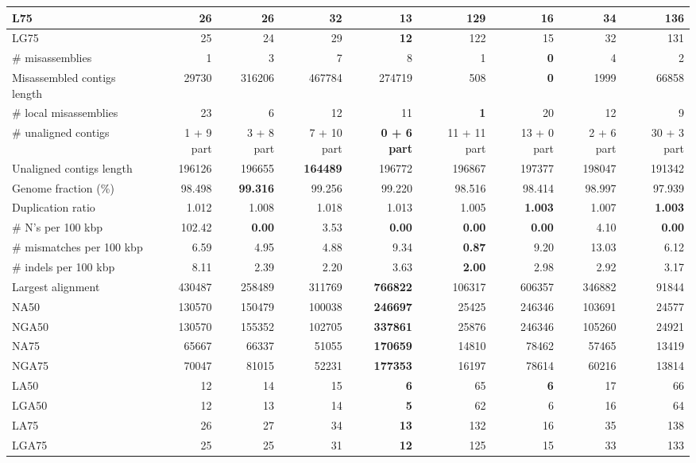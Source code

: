 \documentclass[12pt,a4paper]{article}
\begin{document}
\begin{table}[ht]
\begin{center}
\begin{tabular}{|l*{8}{|r}|}
L75 & 26 & 26 & 32 & {\bf 13} & 129 & 16 & 34 & 136 \\ \hline
LG75 & 25 & 24 & 29 & {\bf 12} & 122 & 15 & 32 & 131 \\ \hline
\# misassemblies & 1 & 3 & 7 & 8 & 1 & {\bf 0} & 4 & 2 \\ \hline
Misassembled contigs length & 29730 & 316206 & 467784 & 274719 & 508 & {\bf 0} & 1999 & 66858 \\ \hline
\# local misassemblies & 23 & 6 & 12 & 11 & {\bf 1} & 20 & 12 & 9 \\ \hline
\# unaligned contigs & 1 + 9 part & 3 + 8 part & 7 + 10 part & {\bf 0 + 6 part} & 11 + 11 part & 13 + 0 part & 2 + 6 part & 30 + 3 part \\ \hline
Unaligned contigs length & 196126 & 196655 & {\bf 164489} & 196772 & 196867 & 197377 & 198047 & 191342 \\ \hline
Genome fraction (\%) & 98.498 & {\bf 99.316} & 99.256 & 99.220 & 98.516 & 98.414 & 98.997 & 97.939 \\ \hline
Duplication ratio & 1.012 & 1.008 & 1.018 & 1.013 & 1.005 & {\bf 1.003} & 1.007 & {\bf 1.003} \\ \hline
\# N's per 100 kbp & 102.42 & {\bf 0.00} & 3.53 & {\bf 0.00} & {\bf 0.00} & {\bf 0.00} & 4.10 & {\bf 0.00} \\ \hline
\# mismatches per 100 kbp & 6.59 & 4.95 & 4.88 & 9.34 & {\bf 0.87} & 9.20 & 13.03 & 6.12 \\ \hline
\# indels per 100 kbp & 8.11 & 2.39 & 2.20 & 3.63 & {\bf 2.00} & 2.98 & 2.92 & 3.17 \\ \hline
Largest alignment & 430487 & 258489 & 311769 & {\bf 766822} & 106317 & 606357 & 346882 & 91844 \\ \hline
NA50 & 130570 & 150479 & 100038 & {\bf 246697} & 25425 & 246346 & 103691 & 24577 \\ \hline
NGA50 & 130570 & 155352 & 102705 & {\bf 337861} & 25876 & 246346 & 105260 & 24921 \\ \hline
NA75 & 65667 & 66337 & 51055 & {\bf 170659} & 14810 & 78462 & 57465 & 13419 \\ \hline
NGA75 & 70047 & 81015 & 52231 & {\bf 177353} & 16197 & 78614 & 60216 & 13814 \\ \hline
LA50 & 12 & 14 & 15 & {\bf 6} & 65 & {\bf 6} & 17 & 66 \\ \hline
LGA50 & 12 & 13 & 14 & {\bf 5} & 62 & 6 & 16 & 64 \\ \hline
LA75 & 26 & 27 & 34 & {\bf 13} & 132 & 16 & 35 & 138 \\ \hline
LGA75 & 25 & 25 & 31 & {\bf 12} & 125 & 15 & 33 & 133 \\ \hline
\end{tabular}
\end{center}
\end{table}
\end{document}
